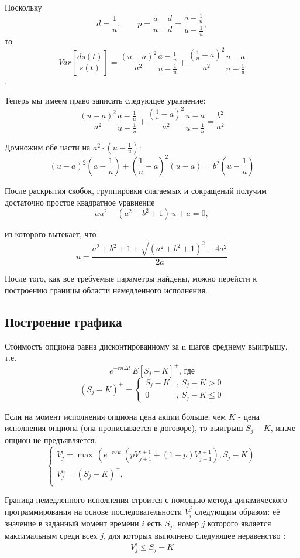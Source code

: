 \documentclass[oneside,final,12pt]{article}
\begin{document}
Поскольку $$d = \frac{1}{u}, \qquad p = \frac{a-d}{u-d} = \frac{a-\frac{1}{u}}{u-\frac{1}{u}},$$ то
$$ Var\left[\frac{ds(t)}{s(t)}\right] = \frac{(u-a)^2}{a^2} \frac{a-\frac{1}{u}}{u-\frac{1}{u}} + 
  \frac{(\frac{1}{u}-a)^2}{a^2} \frac{u-a}{u-\frac{1}{u}}$$.

Теперь мы имеем право записать следующее уравнение:
$$ \frac{(u-a)^2}{a^2} \frac{a-\frac{1}{u}}{u-\frac{1}{u}} + 
  \frac{(\frac{1}{u}-a)^2}{a^2} \frac{u-a}{u-\frac{1}{u}} = \frac{b^2}{a^2}$$

Домножим обе части на $a^2 \cdot \left( u-\frac{1}{u}\right)$:
$$ (u-a)^2\left(a-\frac{1}{u}\right) + \left(\frac{1}{u}-a\right)^2\left(u-a\right) = b^2\left(u-\frac{1}{u}\right) $$

После раскрытия скобок, группировки слагаемых и сокращений получим достаточно простое квадратное уравнение
$$ a u^2 - (a^2+b^2+1) \, u + a = 0 ,$$

\noindent
из которого вытекает, что
$$ u = \frac{a^2+b^2+1 + \sqrt{(a^2+b^2+1)^2-4a^2}}{2a}
$$

После того, как все требуемые параметры найдены, можно перейсти к построению границы области немедленного исполнения. 

\subsection{Построение графика}

Стоимость опциона равна дисконтированному за n шагов среднему выигрышу, т.е.
$$ e^{-r n\Delta t} \, E{[S_j-K]}^+ \text{, где}$$
\begin{equation*}
		(S_j-K)^+=
		\begin{cases}
		S_j-K & , \, S_j-K>0 \\
		0 & , \, S_j-K \leq 0
		\end{cases}
\end{equation*}

Если на момент исполнения опциона цена акции больше, чем $K$ - цена исполнения опциона (она прописывается в договоре), то выигрыш $S_j - K$, иначе опцион не предъявляется.   
\begin{equation*}
		\begin{cases}
		V_j^i = \max\,(e^{-r\Delta t} \, (pV_{j+1}^{i+1}+(1-p)V_{j-1}^{i+1}),S_j-K) \\
		V_j^n = (S_j-K)^+, \\
		\end{cases}
\end{equation*}

Граница немедленного исполнения строится с помощью метода динамического программирования на основе последовательности $V_i^j$ следующим образом: её значение в заданный момент времени $i$ есть $S_j$, номер $j$ которого является максимальным среди всех $j$, для которых выполнено следующее неравенство \cite{broadie}:
$$ V^i_j \leq S_j - K$$
\end{document}
